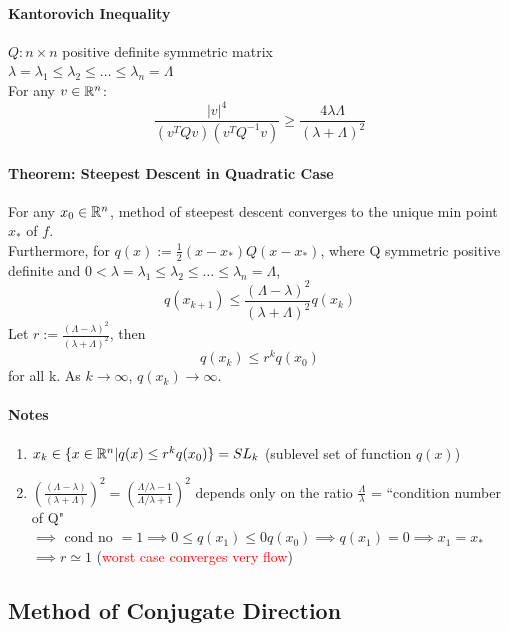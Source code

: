 \documentclass[11pt]{article}
\begin{document}
\paragraph{Kantorovich Inequality}
$Q: n\times n$ positive definite symmetric matrix \\
$\lambda = \lambda_1 \leq \lambda_2 \leq \hdots \leq \lambda_n = \Lambda$ \\
For any $v \in \mathbb{R}^n$:
$$ \frac{|v|^4}{(v^TQv)(v^TQ^{-1}v)} \geq \frac{4\lambda \Lambda}{(\lambda + \Lambda)^2} $$


\paragraph{Theorem: Steepest Descent in Quadratic Case}
For any $x_0 \in \mathbb{R}^n$, method of steepest descent converges to the unique min point $x_*$ of $f$. \\
Furthermore, for $q(x) := \frac{1}{2} (x - x_*) Q (x - x_*)$, where Q symmetric positive definite and $0 < \lambda = \lambda_1 \leq \lambda_2 \leq \hdots \leq \lambda_n = \Lambda$,  $$q(x_{k+1}) \leq \frac{(\Lambda - \lambda)^2}{(\lambda + \Lambda)^2} q(x_k)$$
Let $r := \frac{(\Lambda - \lambda)^2}{(\lambda + \Lambda)^2}$, then
$$q(x_k) \leq r^k q(x_0)$$ for all k. As $k \rightarrow \infty$, $q(x_k) \rightarrow \infty$.

\paragraph{Notes}
\begin{enumerate}
	\item $x_k \in \{ x \in \mathbb{R}^n| q(x) \leq r^k q(x_0)\} = SL_k$ (sublevel set of function $q(x)$)
	\item $(\frac{(\Lambda - \lambda)}{(\lambda + \Lambda)})^2 = (\frac{\Lambda / \lambda - 1}{\Lambda / \lambda + 1})^2$ depends only on the ratio $\frac{\Lambda}{\lambda}$ = ``condition number of Q" \\
	$\implies$ cond no $= 1 \implies 0 \leq q(x_1) \leq 0q(x_0) \implies q(x_1) = 0 \implies x_1 = x_*$\\
	 $\implies r \simeq 1$ (\textcolor{red}{worst case converges very flow})
\end{enumerate}

\subsection{Method of Conjugate Direction}
\end{document}
